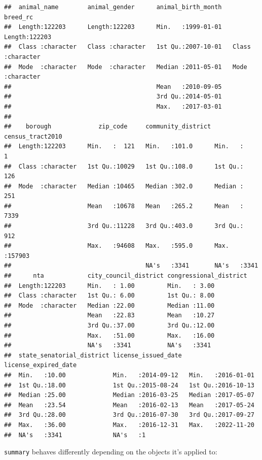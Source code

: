 \documentclass[
]{book}
\begin{document}
\begin{verbatim}
##  animal_name        animal_gender      animal_birth_month     breed_rc        
##  Length:122203      Length:122203      Min.   :1999-01-01   Length:122203     
##  Class :character   Class :character   1st Qu.:2007-10-01   Class :character  
##  Mode  :character   Mode  :character   Median :2011-05-01   Mode  :character  
##                                        Mean   :2010-09-05                     
##                                        3rd Qu.:2014-05-01                     
##                                        Max.   :2017-03-01                     
##                                                                               
##    borough             zip_code     community_district census_tract2010
##  Length:122203      Min.   :  121   Min.   :101.0      Min.   :     1  
##  Class :character   1st Qu.:10029   1st Qu.:108.0      1st Qu.:   126  
##  Mode  :character   Median :10465   Median :302.0      Median :   251  
##                     Mean   :10678   Mean   :265.2      Mean   :  7339  
##                     3rd Qu.:11228   3rd Qu.:403.0      3rd Qu.:   912  
##                     Max.   :94608   Max.   :595.0      Max.   :157903  
##                                     NA's   :3341       NA's   :3341    
##      nta            city_council_district congressional_district
##  Length:122203      Min.   : 1.00         Min.   : 3.00         
##  Class :character   1st Qu.: 6.00         1st Qu.: 8.00         
##  Mode  :character   Median :22.00         Median :11.00         
##                     Mean   :22.83         Mean   :10.27         
##                     3rd Qu.:37.00         3rd Qu.:12.00         
##                     Max.   :51.00         Max.   :16.00         
##                     NA's   :3341          NA's   :3341          
##  state_senatorial_district license_issued_date  license_expired_date
##  Min.   :10.00             Min.   :2014-09-12   Min.   :2016-01-01  
##  1st Qu.:18.00             1st Qu.:2015-08-24   1st Qu.:2016-10-13  
##  Median :25.00             Median :2016-03-25   Median :2017-05-07  
##  Mean   :23.54             Mean   :2016-02-13   Mean   :2017-05-24  
##  3rd Qu.:28.00             3rd Qu.:2016-07-30   3rd Qu.:2017-09-27  
##  Max.   :36.00             Max.   :2016-12-31   Max.   :2022-11-20  
##  NA's   :3341              NA's   :1
\end{verbatim}

\texttt{summary} behaves differently depending on the objects it's applied to:
\end{document}
